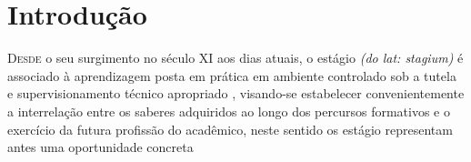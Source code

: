 \chapter{Introdução} %
\label{chap:Introdução}
\lettrine{D}{esde} o seu surgimento no século XI  aos dias atuais, o estágio \textit{(do lat: stagium)} é associado à aprendizagem posta em prática em ambiente controlado sob a tutela e supervisionamento técnico apropriado \cite{COLOMBO:2014}, visando-se estabelecer convenientemente a interrelação entre os saberes adquiridos ao longo dos percursos formativos e o exercício da futura profissão do acadêmico, neste sentido os estágio representam antes uma oportunidade concreta 

